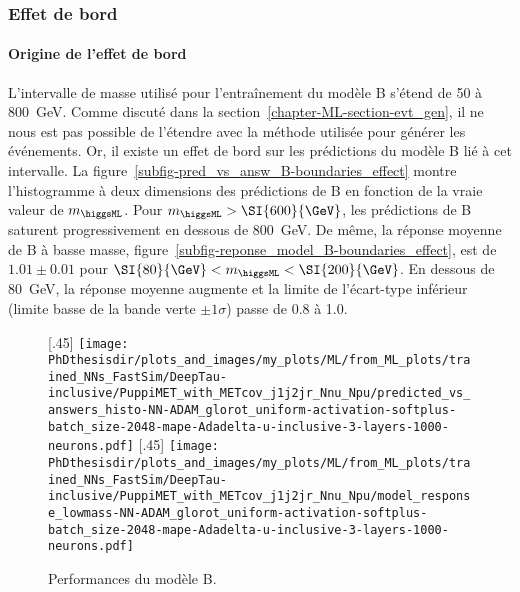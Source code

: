 \subsubsection{Effet de bord}
\paragraph{Origine de l'effet de bord}
L'intervalle de masse utilisé pour l'entraînement du modèle B
s'étend de \num{50} à \SI{800}{\GeV}.
Comme discuté dans la section~\ref{chapter-ML-section-evt_gen},
il ne nous est pas possible de l'étendre avec la méthode utilisée pour générer les événements.
Or, il existe un effet de bord sur les prédictions du modèle B lié à cet intervalle.
La figure~\ref{subfig-pred_vs_answ_B-boundaries_effect} montre l'histogramme à deux dimensions des prédictions de B en fonction de la vraie valeur de $m_{\higgsML}$.
Pour $m_{\higgsML}>\SI{600}{\GeV}$, les prédictions de B saturent progressivement en dessous de \SI{800}{\GeV}.
De même, la réponse moyenne de B à basse masse, figure~\ref{subfig-reponse_model_B-boundaries_effect},
est de $\num{1.01}\pm\num{0.01}$ pour $\SI{80}{\GeV}<m_{\higgsML}<\SI{200}{\GeV}$.
En dessous de \SI{80}{\GeV}, la réponse moyenne augmente
et
la limite de l'écart-type inférieur (limite basse de la bande verte $\pm1\sigma$) passe de \num{0.8} à \num{1.0}.
\begin{figure}[t]
\centering

[.45\textwidth]
{\texttt{[image: \\PhDthesisdir/plots\_and\_images/my\_plots/ML/from\_ML\_plots/trained\_NNs\_FastSim/DeepTau-inclusive/PuppiMET\_with\_METcov\_j1j2jr\_Nnu\_Npu/predicted\_vs\_answers\_histo-NN-ADAM\_glorot\_uniform-activation-softplus-batch\_size-2048-mape-Adadelta-u-inclusive-3-layers-1000-neurons.pdf]}\vspace{-.5\baselineskip}}
\hfill
{}[.45\textwidth]
{\texttt{[image: \\PhDthesisdir/plots\_and\_images/my\_plots/ML/from\_ML\_plots/trained\_NNs\_FastSim/DeepTau-inclusive/PuppiMET\_with\_METcov\_j1j2jr\_Nnu\_Npu/model\_response\_lowmass-NN-ADAM\_glorot\_uniform-activation-softplus-batch\_size-2048-mape-Adadelta-u-inclusive-3-layers-1000-neurons.pdf]}\vspace{-.5\baselineskip}}

\caption{Performances du modèle B.}
\label{fig-B-boundaries_effect}
\end{figure}
